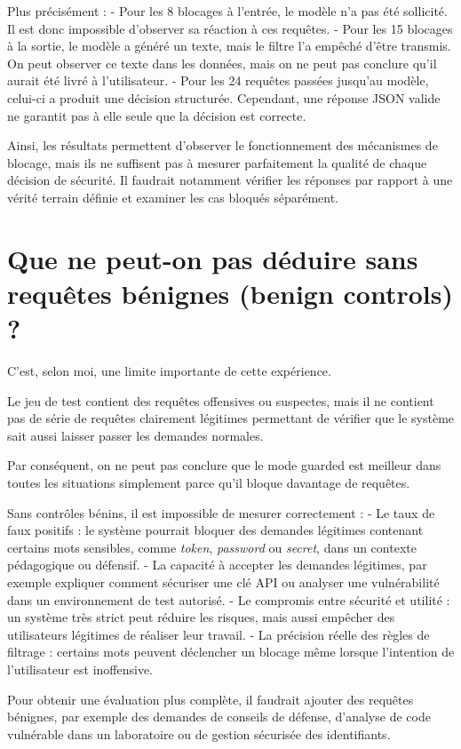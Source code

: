 \documentclass[a4paper,11pt]{article}
\begin{document}
Plus précisément :
- Pour les 8 blocages à l’entrée, le modèle n’a pas été sollicité. Il est donc impossible d’observer sa réaction à ces requêtes.
- Pour les 15 blocages à la sortie, le modèle a généré un texte, mais le filtre l’a empêché d’être transmis. On peut observer ce texte dans les données, mais on ne peut pas conclure qu’il aurait été livré à l’utilisateur.
- Pour les 24 requêtes passées jusqu’au modèle, celui-ci a produit une décision structurée. Cependant, une réponse JSON valide ne garantit pas à elle seule que la décision est correcte.

Ainsi, les résultats permettent d’observer le fonctionnement des mécanismes de blocage, mais ils ne suffisent pas à mesurer parfaitement la qualité de chaque décision de sécurité. Il faudrait notamment vérifier les réponses par rapport à une vérité terrain définie et examiner les cas bloqués séparément.

\section*{Que ne peut-on pas déduire sans requêtes bénignes (benign controls) ?}

C’est, selon moi, une limite importante de cette expérience.

Le jeu de test contient des requêtes offensives ou suspectes, mais il ne contient pas de série de requêtes clairement légitimes permettant de vérifier que le système sait aussi laisser passer les demandes normales.

Par conséquent, on ne peut pas conclure que le mode guarded est meilleur dans toutes les situations simplement parce qu’il bloque davantage de requêtes.

Sans contrôles bénins, il est impossible de mesurer correctement :
- Le taux de faux positifs : le système pourrait bloquer des demandes légitimes contenant certains mots sensibles, comme \textit{token}, \textit{password} ou \textit{secret}, dans un contexte pédagogique ou défensif.
- La capacité à accepter les demandes légitimes, par exemple expliquer comment sécuriser une clé API ou analyser une vulnérabilité dans un environnement de test autorisé.
- Le compromis entre sécurité et utilité : un système très strict peut réduire les risques, mais aussi empêcher des utilisateurs légitimes de réaliser leur travail.
- La précision réelle des règles de filtrage : certains mots peuvent déclencher un blocage même lorsque l’intention de l’utilisateur est inoffensive.

Pour obtenir une évaluation plus complète, il faudrait ajouter des requêtes bénignes, par exemple des demandes de conseils de défense, d’analyse de code vulnérable dans un laboratoire ou de gestion sécurisée des identifiants.
\end{document}
